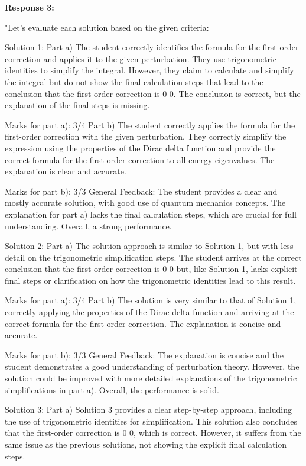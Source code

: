 \documentclass[a4paper,11pt]{article}
\begin{document}
\textbf{Response 3:}

"Let's evaluate each solution based on the given criteria:

Solution 1:
Part a)
The student correctly identifies the formula for the first-order correction and applies it to the given perturbation. They use trigonometric identities to simplify the integral. However, they claim to calculate and simplify the integral but do not show the final calculation steps that lead to the conclusion that the first-order correction is 
0
0. The conclusion is correct, but the explanation of the final steps is missing.

Marks for part a): 3/4
Part b)
The student correctly applies the formula for the first-order correction with the given perturbation. They correctly simplify the expression using the properties of the Dirac delta function and provide the correct formula for the first-order correction to all energy eigenvalues. The explanation is clear and accurate.

Marks for part b): 3/3
General Feedback: The student provides a clear and mostly accurate solution, with good use of quantum mechanics concepts. The explanation for part a) lacks the final calculation steps, which are crucial for full understanding. Overall, a strong performance.

Solution 2:
Part a)
The solution approach is similar to Solution 1, but with less detail on the trigonometric simplification steps. The student arrives at the correct conclusion that the first-order correction is 
0
0 but, like Solution 1, lacks explicit final steps or clarification on how the trigonometric identities lead to this result.

Marks for part a): 3/4
Part b)
The solution is very similar to that of Solution 1, correctly applying the properties of the Dirac delta function and arriving at the correct formula for the first-order correction. The explanation is concise and accurate.

Marks for part b): 3/3
General Feedback: The explanation is concise and the student demonstrates a good understanding of perturbation theory. However, the solution could be improved with more detailed explanations of the trigonometric simplifications in part a). Overall, the performance is solid.

Solution 3:
Part a)
Solution 3 provides a clear step-by-step approach, including the use of trigonometric identities for simplification. This solution also concludes that the first-order correction is 
0
0, which is correct. However, it suffers from the same issue as the previous solutions, not showing the explicit final calculation steps.
\end{document}
